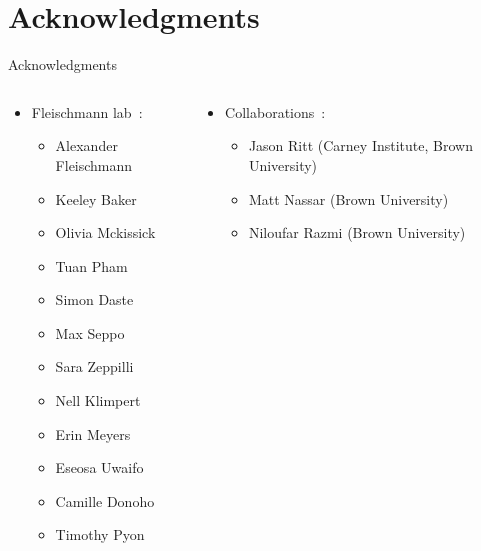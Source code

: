 \documentclass[bigger]{beamer}
\begin{document}
\section*{Acknowledgments}
\label{sec:orga817e12}
{%
\begin{frame}{Acknowledgments}
    \vspace{1em}
    \begin{columns}[T]
        \begin{column}{0.5\textwidth}
            \begin{itemize}
                \small
                \item Fleischmann lab~:
                \begin{itemize}
                    \tiny
                    \item Alexander Fleischmann
                    \item Keeley Baker
                    \item Olivia Mckissick
                    \item Tuan Pham
                    \item Simon Daste
                    \item Max Seppo
                    \item Sara Zeppilli
                    \item Nell Klimpert
                    \item Erin Meyers
                    \item Eseosa Uwaifo
                    \item Camille Donoho
                    \item Timothy Pyon
                \end{itemize}
            \end{itemize}
        \end{column}

        \begin{column}{0.5\textwidth}
            \begin{itemize}
                \small
                \item Collaborations~:
                \begin{itemize}
                    \tiny
                    \item Jason Ritt (Carney Institute, Brown University)
                    \item Matt Nassar (Brown University)
                    \item Niloufar Razmi (Brown University)
                \end{itemize}
            \end{itemize}
        \end{column}
    \end{columns}
\end{frame}
}
\end{document}
